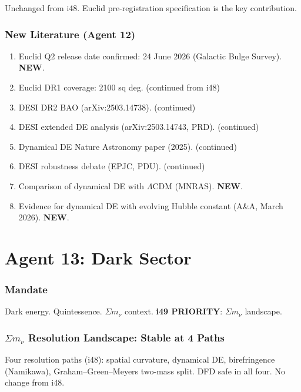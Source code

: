 \documentclass[11pt,a4paper]{article}
\newcommand{\NEW}{\textcolor{dfdblue}{\textbf{NEW}}}
\begin{document}
Unchanged from i48. Euclid pre-registration specification is the key contribution.

\section{New Literature (Agent 12)}

\begin{enumerate}
\item Euclid Q2 release date confirmed: 24 June 2026 (Galactic Bulge Survey). \NEW.
\item Euclid DR1 coverage: 2100 sq deg. (continued from i48)
\item DESI DR2 BAO (arXiv:2503.14738). (continued)
\item DESI extended DE analysis (arXiv:2503.14743, PRD). (continued)
\item Dynamical DE Nature Astronomy paper (2025). (continued)
\item DESI robustness debate (EPJC, PDU). (continued)
\item Comparison of dynamical DE with $\Lambda$CDM (MNRAS). \NEW.
\item Evidence for dynamical DE with evolving Hubble constant (A\&A, March 2026). \NEW.
\end{enumerate}


\part{Agent 13: Dark Sector}
\label{part:agent13}

\section{Mandate}

Dark energy. Quintessence. $\Sigma m_\nu$ context. \textbf{i49 PRIORITY}: $\Sigma m_\nu$ landscape.

\section{$\Sigma m_\nu$ Resolution Landscape: Stable at 4 Paths}

Four resolution paths (i48): spatial curvature, dynamical DE, birefringence (Namikawa), Graham--Green--Meyers two-mass split. DFD safe in all four. No change from i48.
\end{document}

